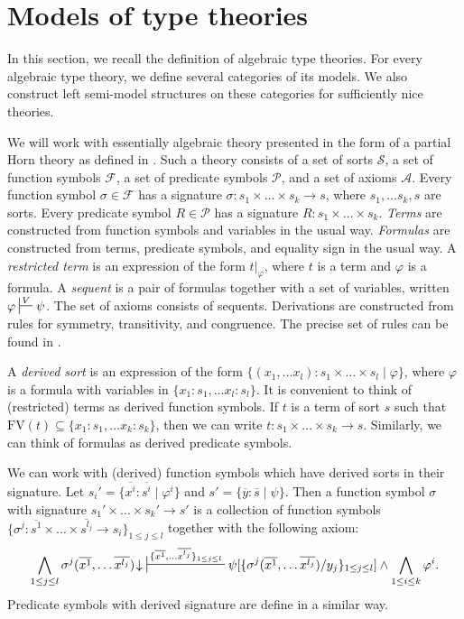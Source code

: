 \documentclass[reqno]{amsart}
\theoremstyle{definition}
\theoremstyle{remark}
\newcommand{\fs}[1]{\mathrm{#1}}
\numberwithin{figure}{section}
\begin{document}
\section{Models of type theories}

In this section, we recall the definition of algebraic type theories.
For every algebraic type theory, we define several categories of its models.
We also construct left semi-model structures on these categories for sufficiently nice theories.

We will work with essentially algebraic theory presented in the form of a partial Horn theory as defined in \cite{PHL}.
Such a theory consists of a set of sorts $\mathcal{S}$, a set of function symbols $\mathcal{F}$, a set of predicate symbols $\mathcal{P}$, and a set of axioms $\mathcal{A}$.
Every function symbol $\sigma \in \mathcal{F}$ has a signature $\sigma : s_1 \times \ldots \times s_k \to s$, where $s_1, \ldots s_k, s$ are sorts.
Every predicate symbol $R \in \mathcal{P}$ has a signature $R : s_1 \times \ldots \times s_k$.
\emph{Terms} are constructed from function symbols and variables in the usual way.
\emph{Formulas} are constructed from terms, predicate symbols, and equality sign in the usual way.
A \emph{restricted term} is an expression of the form $t|_\varphi$, where $t$ is a term and $\varphi$ is a formula.
A \emph{sequent} is a pair of formulas together with a set of variables, written $\varphi \sststile{}{V} \psi$.
The set of axioms consists of sequents.
Derivations are constructed from rules for symmetry, transitivity, and congruence.
The precise set of rules can be found in \cite{PHL,alg-tt,morita-equiv}.

A \emph{derived sort} is an expression of the form $\{ (x_1, \ldots x_l) : s_1 \times \ldots \times s_l \mid \varphi \}$,
where $\varphi$ is a formula with variables in $\{ x_1 : s_1, \ldots x_l : s_l \}$.
It is convenient to think of (restricted) terms as derived function symbols.
If $t$ is a term of sort $s$ such that $\fs{FV}(t) \subseteq \{ x_1 : s_1, \ldots x_k : s_k \}$, then we can write $t : s_1 \times \ldots \times s_k \to s$.
Similarly, we can think of formulas as derived predicate symbols.

We can work with (derived) function symbols which have derived sorts in their signature.
Let $s_i' = \{ \overline{x^i} : \overline{s^i} \mid \varphi^i \}$ and $s' = \{ \overline{y} : \overline{s} \mid \psi \}$.
Then a function symbol $\sigma$ with signature $s_1' \times \ldots \times s_k' \to s'$ is a collection of function symbols
$\{ \sigma^j : \overline{s^1} \times \ldots \times \overline{s^{l_j}} \to s_i \}_{1 \leq j \leq l}$ together with the following axiom:
\[ \bigwedge_{1 \leq j \leq l} \sigma^j(\overline{x^1}, \ldots \overline{x^{l_j}})\!\downarrow\ \sststile{}{\{ \overline{x^1}, \ldots \overline{x^{l_j}} \}_{1 \leq j \leq l}} \psi[\{ \sigma^j(\overline{x^1}, \ldots \overline{x^{l_j}})/y_j \}_{1 \leq j \leq l}] \land \bigwedge_{1 \leq i \leq k} \varphi^i. \]
Predicate symbols with derived signature are define in a similar way.
\end{document}

